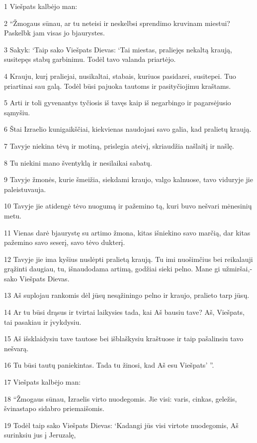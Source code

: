 \par 1 Viešpats kalbėjo man: 
\par 2 “Žmogaus sūnau, ar tu neteisi ir neskelbsi sprendimo kruvinam miestui? Paskelbk jam visas jo bjaurystes. 
\par 3 Sakyk: ‘Taip sako Viešpats Dievas: ‘Tai miestas, praliejęs nekaltą kraują, susitepęs stabų garbinimu. Todėl tavo valanda priartėjo. 
\par 4 Krauju, kurį praliejai, nusikaltai, stabais, kuriuos pasidarei, susitepei. Tuo priartinai sau galą. Todėl būsi pajuoka tautoms ir pasityčiojimu kraštams. 
\par 5 Arti ir toli gyvenantys tyčiosis iš tavęs kaip iš negarbingo ir pagarsėjusio sąmyšiu. 
\par 6 Štai Izraelio kunigaikščiai, kiekvienas naudojasi savo galia, kad pralietų kraują. 
\par 7 Tavyje niekina tėvą ir motiną, prislegia ateivį, skriaudžia našlaitį ir našlę. 
\par 8 Tu niekini mano šventyklą ir nesilaikai sabatų. 
\par 9 Tavyje žmonės, kurie šmeižia, siekdami kraujo, valgo kalnuose, tavo viduryje jie paleistuvauja. 
\par 10 Tavyje jie atidengė tėvo nuogumą ir pažemino tą, kuri buvo nešvari mėnesinių metu. 
\par 11 Vienas darė bjaurystę su artimo žmona, kitas išniekino savo marčią, dar kitas pažemino savo seserį, savo tėvo dukterį. 
\par 12 Tavyje jie ima kyšius nuslėpti pralietą kraują. Tu imi nuošimčius bei reikalauji grąžinti daugiau, tu, išnaudodama artimą, godžiai sieki pelno. Mane gi užmiršai,­sako Viešpats Dievas.­ 
\par 13 Aš suplojau rankomis dėl jūsų nesąžiningo pelno ir kraujo, pralieto tarp jūsų. 
\par 14 Ar tu būsi drąsus ir tvirtai laikysies tada, kai Aš bausiu tave? Aš, Viešpats, tai pasakiau ir įvykdysiu. 
\par 15 Aš išsklaidysiu tave tautose bei išblaškysiu kraštuose ir taip pašalinsiu tavo nešvarą. 
\par 16 Tu būsi tautų paniekintas. Tada tu žinosi, kad Aš esu Viešpats’ ”. 
\par 17 Viešpats kalbėjo man: 
\par 18 “Žmogaus sūnau, Izraelis virto nuodegomis. Jie visi: varis, cinkas, geležis, švinas­tapo sidabro priemaišomis. 
\par 19 Todėl taip sako Viešpats Dievas: ‘Kadangi jūs visi virtote nuodegomis, Aš surinksiu jus į Jeruzalę, 
